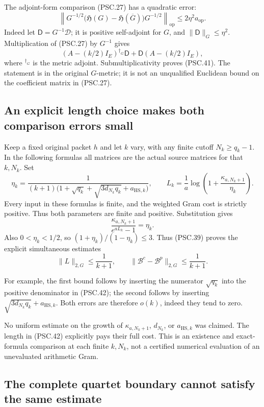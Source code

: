 The adjoint-form comparison (PSC.27) has a quadratic error:
\[
 \left\|
 G^{-1/2}\bigl(\mathfrak H(G)-\mathfrak H(\overline G)\bigr)
 G^{-1/2}
 \right\|_{\mathrm{op}}
 \leq2\eta^2a_{\mathrm{op}}.
 \tag{PSC.41}
\]
Indeed let \(\mathsf D=G^{-1}\mathscr D\); it is positive self-adjoint for \(G\), and \(\|\mathsf D\|_G\leq\eta^2\). Multiplication of (PSC.27) by \(G^{-1}\) gives
\[
 (A-(k/2)I_E)^{\dagger_G}\mathsf D
 +\mathsf D(A-(k/2)I_E),
 \]
where \({}^{\dagger_G}\) is the metric adjoint. Submultiplicativity proves (PSC.41). The statement is in the original \(G\)-metric; it is not an unqualified Euclidean bound on the coefficient matrix in (PSC.27).

\subsection{An explicit length choice makes both comparison errors small}

Keep a fixed original packet \(h\) and let \(k\) vary, with any finite cutoff \(N_k\geq q_k-1\). In the following formulas all matrices are the actual source matrices for that \(k,N_k\). Set
\[
 \eta_k=
 \frac{1}
 {(k+1)\bigl(1+\sqrt{q_k}
       +\sqrt{3d_{N_k}q_k}+a_{\mathrm{HS},k}\bigr)},
 \qquad
 L_k=\frac1a\log\left(1+\frac{\kappa_{a,N_k+1}}{\eta_k}\right).
 \tag{PSC.42}
\]
Every input in these formulas is finite, and the weighted Gram cost is strictly positive. Thus both parameters are finite and positive. Substitution gives
\[
 \frac{\kappa_{a,N_k+1}}{e^{aL_k}-1}=\eta_k.
 \]
Also \(0<\eta_k<1/2\), so
\((1+\eta_k)/(1-\eta_k)\leq3\).
Thus (PSC.39) proves the explicit simultaneous estimates
\[
 \boxed{
 \|L\|_{2,G}\leq\frac1{k+1},\qquad
 \|\mathscr B^c-\mathscr B^p\|_{2,G}
          \leq\frac1{k+1}.}
 \tag{PSC.43}
\]

For example, the first bound follows by inserting the numerator
\(\sqrt{q_k}\) into the positive denominator in (PSC.42); the second follows by inserting
\(\sqrt{3d_{N_k}q_k}+a_{\mathrm{HS},k}\).
Both errors are therefore \(o(k)\), indeed they tend to zero.

No uniform estimate on the growth of \(\kappa_{a,N_k+1}\), \(d_{N_k}\), or \(a_{\mathrm{HS},k}\) was claimed. The length in (PSC.42) explicitly pays their full cost. This is an existence and exact-formula comparison at each finite \(k,N_k\), not a certified numerical evaluation of an unevaluated arithmetic Gram.

\subsection{The complete quartet boundary cannot satisfy the same estimate}

